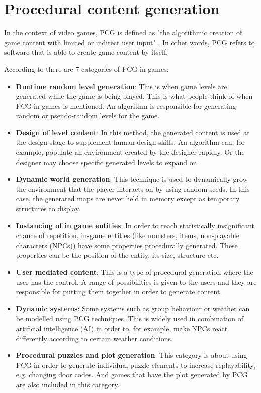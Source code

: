 \section{Procedural content generation}

In the context of video games, PCG is defined as "the algorithmic creation of game content with
limited or indirect user input" \cite{togelius:2011}. In other words, PCG refers to software that is able to create game content by itself.

According to \cite{doull:2008} there are 7 categories of PCG in games:

\begin{itemize}
\item \textbf{Runtime random level generation}: This is when game levels are generated while the game is being played. This is what people think of when PCG in games is mentioned. An algorithm is responsible for generating random or pseudo-random levels for the game.

\item \textbf{Design of level content}: In this method, the generated content is used at the design stage to supplement human design skills. An algorithm can, for example, populate an environment created by the designer rapidly. Or the designer may choose specific generated levels to expand on.

\item \textbf{Dynamic world generation}: This technique is used to dynamically grow the environment that the player interacts on by using random seeds. In this case, the generated maps are never held in memory except as temporary structures to display.

\item \textbf{Instancing of in game entities}: In order to reach statistically insignificant chance of repetition, in-game entities (like monsters, items, non-playable characters (NPCs)) have some properties procedurally generated. These properties can be the position of the entity, its size, structure etc.

\item \textbf{User mediated content}: This is a type of procedural generation where the user has the control. A range of possibilities is given to the users and they are responsible for putting them together in order to generate content.

\item \textbf{Dynamic systems}: Some systems such as group behaviour or weather can be modelled using PCG techniques. This is widely used in combination of artificial intelligence (AI) in order to, for example, make NPCs react differently according to certain weather conditions.

\item \textbf{Procedural puzzles and plot generation}: This category is about using PCG in order to generate individual puzzle elements to increase replayability, e.g. changing door codes. And games that have the plot generated by PCG are also included in this category.
\end{itemize}


